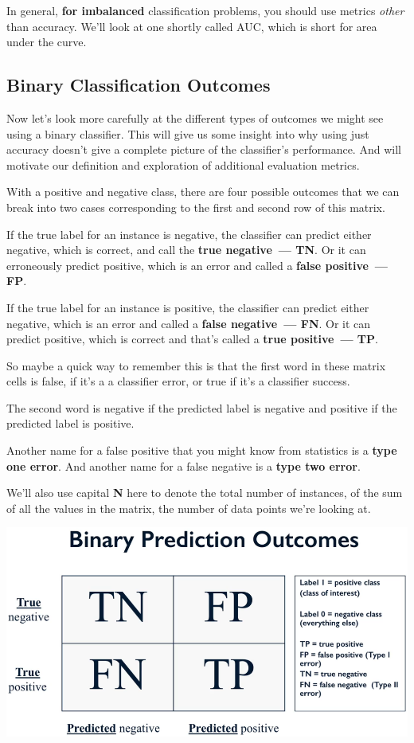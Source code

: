 \begin{multicols}{2}
In general, \textbf{for imbalanced} classification problems, you should use metrics \emph{other} than accuracy. We'll look at one shortly called AUC, which is short for area under the curve. 


\subsection{Binary Classification Outcomes}

Now let's look more carefully at the different types of outcomes we might see using a binary classifier. This will give us some insight into why using just accuracy doesn't give a complete picture of the classifier's performance. And will motivate our definition and exploration of additional evaluation metrics. 

With a positive and negative class, there are four possible outcomes that we can break into two cases corresponding to the first and second row of this matrix. 

If the true label for an instance is negative, the classifier can predict either negative, which is correct, and call the \textbf{true negative~--- TN}. Or it can erroneously predict positive, which is an error and called a \textbf{false positive~--- FP}. 

If the true label for an instance is positive, the classifier can predict either negative, which is an error and called a \textbf{false negative~--- FN}. Or it can predict positive, which is correct and that's called a \textbf{true positive~--- TP}. 

So maybe a quick way to remember this is that the first word in these matrix cells is false, if it's a a classifier error, or true if it's a classifier success. 

The second word is negative if the predicted label is negative and positive if the predicted label is positive. 

Another name for a false positive that you might know from statistics is a \textbf{type one error}. And another name for a false negative is a \textbf{type two error}. 

We'll also use capital \textbf{N} here to denote the total number of instances, of the sum of all the values in the matrix, the number of data points we're looking at. 

\begin{center}
\includegraphics[width=\linewidth]{img/Binary-Prediction-Outcomes.png} 
\end{center}


\end{multicols}
